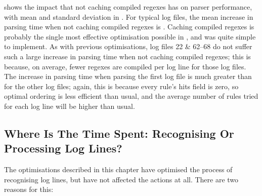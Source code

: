 shows the impact that not caching compiled regexes has on parser
performance, with mean and standard deviation in .  For typical log
files, the mean increase in parsing time when not caching compiled regexes
is .  Caching
compiled regexes is probably the single most effective optimisation
possible in \parsername{}, and was quite simple to implement.  As with
previous optimisations, log files 22 \& 62--68 do not suffer such a large
increase in parsing time when not caching compiled regexes; this is
because, on average, fewer regexes are compiled per log line for those log
files.  The increase in parsing time when parsing the first log file is
much greater than for the other log files; again, this is because every
rule's hits field is zero, so optimal ordering is less efficient than
usual, and the average number of rules tried for each log line will be
higher than usual.



\FloatBarrier{}

\subsection{Where Is The Time Spent: Recognising Or Processing Log Lines?}

\label{recognising vs processing}

The optimisations described in this chapter have optimised the process of
recognising log lines, but have not affected the actions at all.  There are
two reasons for this:

